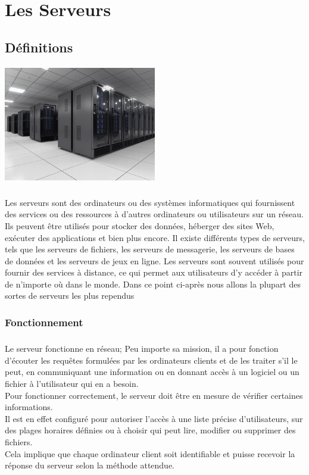  
 
  \chapter{ Les Serveurs}
 \section{Définitions}
\paragraph{ \includegraphics[width=0.5\textwidth]{PhotoMemoire/salle-serveur.jpg}}
\paragraph{ }
Les serveurs sont des ordinateurs ou des systèmes informatiques qui fournissent des services ou des ressources à d'autres ordinateurs ou utilisateurs sur un réseau. Ils peuvent être utilisés pour stocker des données, héberger des sites Web, exécuter des applications et bien plus encore. Il existe différents types de serveurs, tels que les serveurs de fichiers, les serveurs de messagerie, les serveurs de bases de données et les serveurs de jeux en ligne. Les serveurs sont souvent utilisés pour fournir des services à distance, ce qui permet aux utilisateurs d'y accéder à partir de n'importe où dans le monde.
 Dans ce point ci-après nous allons la plupart des sortes de serveurs les plus rependus 
 \subsection*{Fonctionnement}
 \paragraph{ }
 Le serveur fonctionne en réseau; Peu importe sa mission, il a pour fonction d’écouter les requêtes formulées par les ordinateurs clients et de les traiter s’il le peut, en communiquant une information ou en donnant accès à un logiciel ou un fichier à l’utilisateur qui en a besoin.\\
  Pour fonctionner correctement, le serveur doit être en mesure de vérifier certaines informations.\\
   Il est en effet configuré pour autoriser l’accès à une liste précise d’utilisateurs, sur des plages horaires définies ou à choisir qui peut lire, modifier ou supprimer des fichiers.\\
   Cela implique que chaque ordinateur client soit identifiable et puisse recevoir la réponse du serveur selon la méthode attendue.
